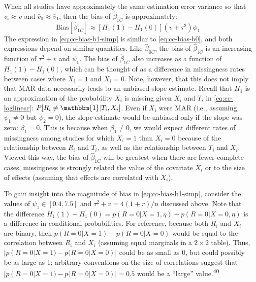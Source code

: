 \documentclass[
]{article}
\begin{document}
When all studies have approximately the same estimation error variance so that \(v_i \approx v\) and \(\bar{v}_0 \approx \bar{v}_1\), then the bias of \(\hat{\beta}_{1C}\) is approximately:
\begin{equation}
\text{Bias}[\hat{\beta}_{1C}] 
  \approx \left[H_1(1) - H_1(0)\right] (v + \tau^2) \psi_1 
\label{eq:cc-bias-b1-simp}
\end{equation}
The expression in \eqref{eq:cc-bias-b1-simp} is similar to \eqref{eq:cc-bias-b0}, and both expressions depend on similar quantities.
Like \(\hat{\beta}_{0C}\), the bias of \(\hat{\beta}_{1C}\) is an increasing function of \(\tau^2 + v\) and \(\psi_1\).
The bias of \(\hat{\beta}_{1C}\) also increases as a function of \(H_1(1) - H_1(0)\), which can be thought of as a difference in missingness rates between cases where \(X_i = 1\) and \(X_i = 0\).
Note, however, that this does not imply that MAR data necessarily leads to an unbiased slope estimate.
Recall that \(H_1\) is an approximation of the probability \(X_i\) is missing given \(X_i\) and \(T_i\) in \eqref{eq:cc-loglinear}: \(P[R_i \neq \mathbbm{1} | T_i, X_i]\).
Even if \(X_i\) were MAR (i.e., assuming \(\psi_1 \neq 0\) but \(\psi_2 = 0\)), the slope estimate would be unbiased only if the slope was zero: \(\beta_1 = 0\).
This is because when \(\beta_1 \neq 0\), we would expect different rates of missingness among studies for which \(X_i = 1\) than \(X_i = 0\) because of the relationship between \(R_i\) and \(T_i\), as well as the relationship between \(T_i\) and \(X_i\).
Viewed this way, the bias of \(\hat{\beta}_{1C}\) will be greatest when there are fewer complete cases, missingness is strongly related the value of the covariate \(X_i\) or to the size of effects (assuming that effects are correlated with \(X_i\)).

To gain insight into the magnitude of bias in \eqref{eq:cc-bias-b1-simp}, consider the values of \(\psi_1 \in [0.4, 7.5]\) and \(\tau^2 + v = 4(1 + r)/n\) discussed above.
Note that the difference \(H_1(1) - H_1(0) = p(R = 0 | X = 1, \eta) - p(R = 0 | X = 0, \eta)\) is a difference in conditional probabilities.
For reference, because both \(R_i\) and \(X_i\) are binary, then \(p(R = 0 | X = 1) - p(R = 0 | X = 0)\) would be equal to the correlation between \(R_i\) and \(X_i\) (assuming equal marginals in a \(2 \times 2\) table).
Thus, \(|p(R = 0 | X = 1) - p(R = 0 | X = 0)|\) could be as small as 0, but could possibly be as large as 1; arbitrary conventions on the size of correlations suggest that \(|p(R = 0 | X = 1) - p(R = 0 | X = 0)| = 0.5\) would be a ``large'' value.\textsuperscript{40}
\end{document}
